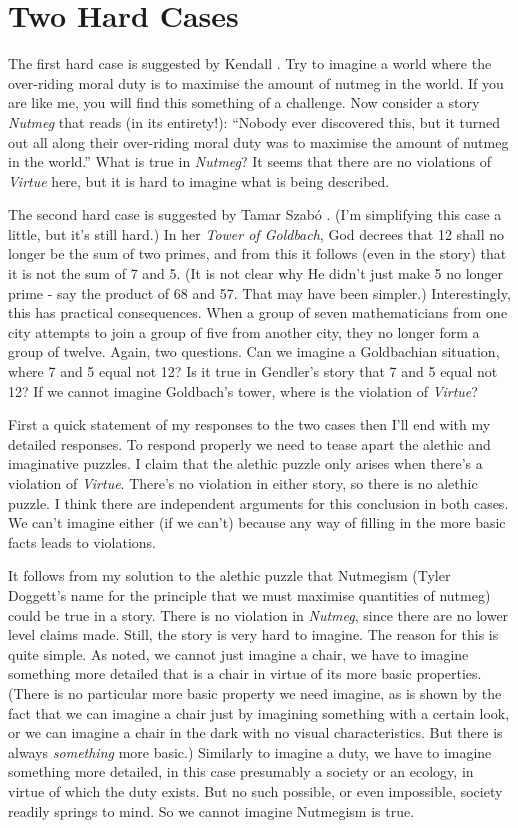 \section{Two Hard Cases}
The first hard case is suggested by Kendall \citet{Walton1994}. Try to imagine a world where the over-riding moral duty is to maximise the amount of nutmeg in the world. If you are like me, you will find this something of a challenge. Now consider a story \textit{Nutmeg }that reads (in its entirety!): ``Nobody ever discovered this, but it turned out all along their over-riding moral duty was to maximise the amount of nutmeg in the world.'' What is true in \textit{Nutmeg}? It seems that there are no violations of \textit{Virtue} here, but it is hard to imagine what is being described.

The second hard case is suggested by Tamar Szab\'{o} \citet{Gendler2000}. (I'm simplifying this case a little, but it's still hard.) In her \textit{Tower of Goldbach}, God decrees that 12 shall no longer be the sum of two primes, and from this it follows (even in the story) that it is not the sum of 7 and 5. (It is not clear why He didn't just make 5 no longer prime - say the product of 68 and 57. That may have been simpler.) Interestingly, this has practical consequences. When a group of seven mathematicians from one city attempts to join a group of five from another city, they no longer form a group of twelve. Again, two questions. Can we imagine a Goldbachian situation, where 7 and 5 equal not 12? Is it true in Gendler's story that 7 and 5 equal not 12? If we cannot imagine Goldbach's tower, where is the violation of \textit{Virtue}?

First a quick statement of my responses to the two cases then I'll end with my detailed responses. To respond properly we need to tease apart the alethic and imaginative puzzles. I claim that the alethic puzzle only arises when there's a violation of \textit{Virtue}. There's no violation in either story, so there is no alethic puzzle. I think there are independent arguments for this conclusion in both cases. We can't imagine either (if we can't) because any way of filling in the more basic facts leads to violations.

It follows from my solution to the alethic puzzle that Nutmegism (Tyler Doggett's name for the principle that we must maximise quantities of nutmeg) could be true in a story. There is no violation in \textit{Nutmeg}, since there are no lower level claims made. Still, the story is very hard to imagine. The reason for this is quite simple. As noted, we cannot just imagine a chair, we have to imagine something more detailed that is a chair in virtue of its more basic properties. (There is no particular more basic property we need imagine, as is shown by the fact that we can imagine a chair just by imagining something with a certain look, or we can imagine a chair in the dark with no visual characteristics. But there is always \textit{something} more basic.) Similarly to imagine a duty, we have to imagine something more detailed, in this case presumably a society or an ecology, in virtue of which the duty exists. But no such possible, or even impossible, society readily springs to mind. So we cannot imagine Nutmegism is true.

